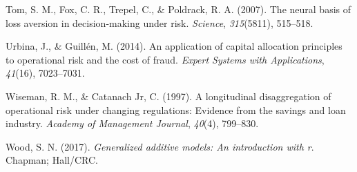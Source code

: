 \documentclass{DissertateUSU}
\begin{document}
\leavevmode\hypertarget{ref-tom2007neural}{}%
Tom, S. M., Fox, C. R., Trepel, C., \& Poldrack, R. A. (2007). The
neural basis of loss aversion in decision-making under risk.
\emph{Science}, \emph{315}(5811), 515--518.

\leavevmode\hypertarget{ref-urbina2014application}{}%
Urbina, J., \& Guillén, M. (2014). An application of capital allocation
principles to operational risk and the cost of fraud. \emph{Expert
Systems with Applications}, \emph{41}(16), 7023--7031.

\leavevmode\hypertarget{ref-wiseman1997longitudinal}{}%
Wiseman, R. M., \& Catanach Jr, C. (1997). A longitudinal disaggregation
of operational risk under changing regulations: Evidence from the
savings and loan industry. \emph{Academy of Management Journal},
\emph{40}(4), 799--830.

\leavevmode\hypertarget{ref-wood2017generalized}{}%
Wood, S. N. (2017). \emph{Generalized additive models: An introduction
with r}. Chapman; Hall/CRC.


\end{document}
